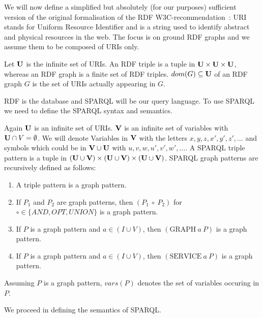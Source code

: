 We will now define a simplified but absolutely (for our purposes) sufficient version of the
original formalisation of the RDF W3C-recommendation~\cite{rdf}:
URI stands for Uniform Resource Identifier and is a string used to identify
abstract and physical resources in the web.
The focus is on ground RDF graphs and we assume them to be composed of URIs only.

\begin{definition}[RDF]
	Let $\mathbf{U}$ is the infinite set of URIs. An RDF triple is a tuple in $\mathbf{U} \times \mathbf{U} \times \mathbf{U}$, whereas an
	RDF graph is a finite set of RDF triples. $dom(G) \subseteq \mathbf{U}$ of an RDF graph $G$ is the set of URIs actually appearing in $G$.
\end{definition}

RDF is the database and SPARQL will be our query language. To use SPARQL we need
to define the SPARQL syntax and semantics.

\begin{definition}
	Again $\mathbf{U}$ is an infinite set of URIs. 
	$\mathbf{V}$ is an infinite set of variables with $\mathbf{U} \cap V = \emptyset$. 
	We will denote Variables in $\mathbf{V}$ with the letters $x,y,z,x',y',z',\dots$ and
	symbols which could be in $\mathbf{V} \cup \mathbf{U}$ with $u,v,w,u',v',w',\dots$.
	A SPARQL triple pattern is a tuple in  $(\mathbf{U} \cup \mathbf{V}) \times (\mathbf{U} \cup \mathbf{V}) \times (\mathbf{U} \cup \mathbf{V})$. 
	SPARQL graph patterns are recursively defined as follows:
	\begin{enumerate}
		\item A triple pattern is a graph pattern.
		\item If $P_1$ and $P_2$ are graph patterns, then $(P_1  \ \circ \ P_2)$ for
			$\circ \in \{ AND, OPT, UNION\}$ is a graph pattern.
		\item If $P$ is a graph pattern and $a \in (I \cup V)$, then $(\mbox{GRAPH} \  a \ P)$ is a graph pattern.
		\item If $P$ is a graph pattern and $a \in (I \cup V)$, then $(\mbox{SERVICE} \  a \ P)$ is a graph pattern.
	\end{enumerate}
	\noindent Assuming $P$ is a graph pattern, $vars(P)$ denotes the set of variables occuring in $P$.
\end{definition}

We proceed in defining the semantics of SPARQL. 

